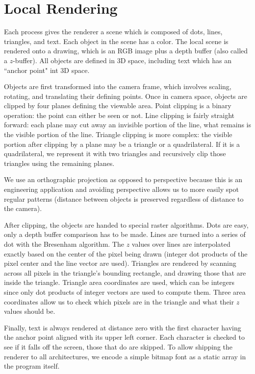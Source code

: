 \documentclass{article}
\begin{document}
\section{Local Rendering}

Each process gives the renderer a scene
which is composed of dots, lines, triangles,
and text.
Each object in the scene has a color.
The local scene is rendered onto a drawing,
which is an RGB image plus a depth buffer
(also called a $z$-buffer).
All objects are defined in 3D space, including
text which has an ``anchor point" int 3D space.

Objects are first transformed into the camera
frame, which involves scaling, rotating, and
translating their defining points.
Once in camera space, objects are clipped by
four planes defining the viewable area.
Point clipping is a binary operation: the point
can either be seen or not.
Line clipping is fairly straight forward: each
plane may cut away an invisible portion of the line, what
remains is the visible portion of the line.
Triangle clipping is more complex: the visible
portion after clipping by a plane may be a triangle
or a quadrilateral.
If it is a quadrilateral, we represent it with two
triangles and recursively clip those triangles using
the remaining planes.

We use an orthographic projection as opposed to
perspective because this is an engineering application
and avoiding perspective allows us to more easily spot
regular patterns (distance between objects is preserved
regardless of distance to the camera).

After clipping, the objects are handed to special
raster algorithms.
Dots are easy, only a depth buffer comparison has
to be made.
Lines are turned into a series of dot with the
Bresenham algorithm.
The $z$ values over lines are interpolated exactly
based on the center of the pixel being drawn
(integer dot products of the pixel center and
the line vector are used).
Triangles are rendered by scanning across all pixels
in the triangle's bounding rectangle, and drawing
those that are inside the triangle.
Triangle area coordinates are used, which can be
integers since only dot products of integer vectors
are used to compute them.
Three area coordinates allow us to check which
pixels are in the triangle and what their $z$
values should be.

Finally, text is always rendered at distance zero
with the first character having the anchor point
aligned with its upper left corner.
Each character is checked to see if it falls off
the screen, those that do are skipped.
To allow shipping the renderer to all architectures,
we encode a simple bitmap font as a static array in the
program itself.
\end{document}
